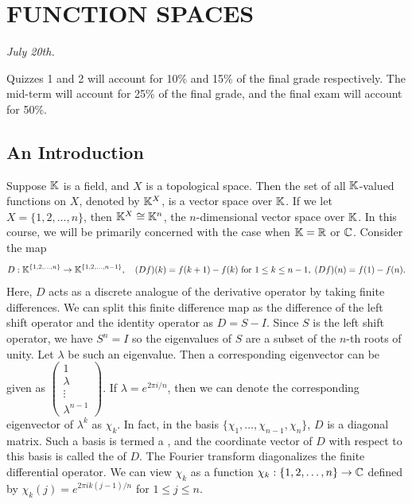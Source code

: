 \chapter{FUNCTION SPACES}

\textit{July 20th.}

Quizzes 1 and 2 will account for 10\% and 15\% of the final grade respectively. The mid-term will account for 25\% of the final grade, and the final exam will account for 50\%.

\section{An Introduction}
Suppose $\mathbb{K}$ is a field, and $X$ is a topological space. Then the set of all $\mathbb{K}$-valued functions on $X$, denoted by $\mathbb{K}^{X}$, is a vector space over $\mathbb{K}$. If we let $X = \{1,2,\ldots,n\}$, then $\mathbb{K}^{X} \cong \mathbb{K}^{n}$, the $n$-dimensional vector space over $\mathbb{K}$. In this course, we will be primarily concerned with the case when $\mathbb{K} = \mathbb{R}$ or $\mathbb{C}$. Consider the map
\begin{align}
    D:\mathbb{K}^{\{1,2,\ldots,n\}} \to \mathbb{K}^{\{1,2,\ldots,n-1\}}, \quad (Df)(k) = f(k+1)-f(k) \text{ for } 1 \leq k \leq n-1, \; (Df)(n) = f(1)-f(n).
\end{align}
Here, $D$ acts as a discrete analogue of the derivative operator by taking finite differences. We can split this finite difference map as the difference of the left shift operator and the identity operator as $D = S-I$. Since $S$ is the left shift operator, we have $S^{n} = I$ so the eigenvalues of $S$ are a subset of the $n$-th roots of unity. Let $\lambda$ be such an eigenvalue. Then a corresponding eigenvector can be given as $\begin{pmatrix}
    1 \\ \lambda \\ \vdots \\ \lambda^{n-1}
\end{pmatrix}$. If $\lambda = e^{2\pi i /n}$, then we can denote the corresponding eigenvector of $\lambda^{k}$ as $\chi_{k}$. In fact, in the basis $\{\chi_{1},\ldots,\chi_{n-1},\chi_{n}\}$, $D$ is a diagonal matrix. Such a basis is termed a , and the coordinate vector of $D$ with respect to this basis is called the  of $D$. The Fourier transform diagonalizes the finite differential operator. We can view $\chi_{k}$ as a function $\chi_{k}:\{1,2,\ldots,n\} \to \mathbb{C}$ defined by $\chi_{k}(j) = e^{2\pi i k(j-1)/n}$ for $1 \leq j \leq n$. 

